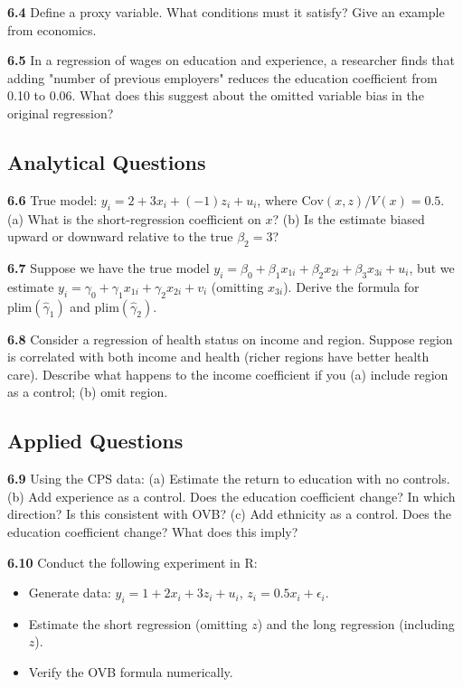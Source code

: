 \textbf{6.4} Define a proxy variable. What conditions must it satisfy? Give an example from economics.

\textbf{6.5} In a regression of wages on education and experience, a researcher finds that adding "number of previous employers" reduces the education coefficient from 0.10 to 0.06. What does this suggest about the omitted variable bias in the original regression?

\subsection{Analytical Questions}

\textbf{6.6} True model: $y_i = 2 + 3x_i + (-1)z_i + u_i$, where $\text{Cov}(x,z)/V(x) = 0.5$.
(a) What is the short-regression coefficient on $x$?
(b) Is the estimate biased upward or downward relative to the true $\beta_2 = 3$?

\textbf{6.7} Suppose we have the true model $y_i = \beta_0 + \beta_1 x_{1i} + \beta_2 x_{2i} + \beta_3 x_{3i} + u_i$, but we estimate $y_i = \gamma_0 + \gamma_1 x_{1i} + \gamma_2 x_{2i} + v_i$ (omitting $x_{3i}$). Derive the formula for $\text{plim}(\hat{\gamma}_1)$ and $\text{plim}(\hat{\gamma}_2)$.

\textbf{6.8} Consider a regression of health status on income and region. Suppose region is correlated with both income and health (richer regions have better health care). Describe what happens to the income coefficient if you (a) include region as a control; (b) omit region.

\subsection{Applied Questions}

\textbf{6.9} Using the CPS data:
(a) Estimate the return to education with no controls.
(b) Add experience as a control. Does the education coefficient change? In which direction? Is this consistent with OVB?
(c) Add ethnicity as a control. Does the education coefficient change? What does this imply?

\textbf{6.10} Conduct the following experiment in R:
\begin{itemize}
\item Generate data: $y_i = 1 + 2x_i + 3z_i + u_i$, $z_i = 0.5 x_i + \epsilon_i$.
\item Estimate the short regression (omitting $z$) and the long regression (including $z$).
\item Verify the OVB formula numerically.
\end{itemize}

